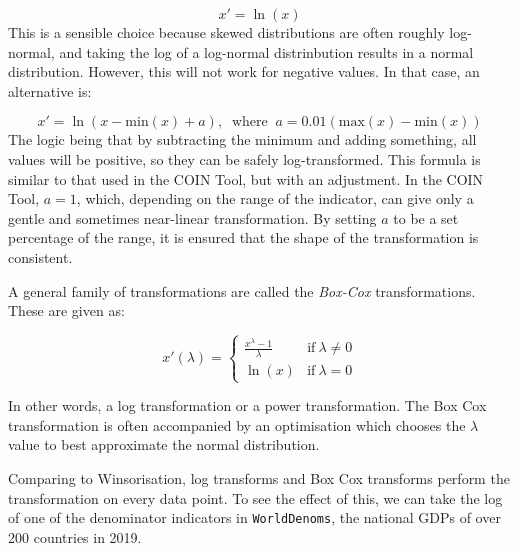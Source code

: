 \documentclass[
]{book}
\newenvironment{Shaded}{\begin{snugshade}}{\end{snugshade}}
\newcommand{\CommentTok}[1]{\textcolor[rgb]{0.56,0.35,0.01}{\textit{#1}}}
\newcommand{\DataTypeTok}[1]{\textcolor[rgb]{0.13,0.29,0.53}{#1}}
\newcommand{\KeywordTok}[1]{\textcolor[rgb]{0.13,0.29,0.53}{\textbf{#1}}}
\newcommand{\NormalTok}[1]{#1}
\newcommand{\OperatorTok}[1]{\textcolor[rgb]{0.81,0.36,0.00}{\textbf{#1}}}
\newcommand{\StringTok}[1]{\textcolor[rgb]{0.31,0.60,0.02}{#1}}
\begin{document}
\[ x' = \ln(x) \]
This is a sensible choice because skewed distributions are often roughly log-normal, and taking the log of a log-normal distrinbution results in a normal distribution. However, this will not work for negative values. In that case, an alternative is:

\[ x' = \ln(x- \text{min}(x)+a), \; \; \text{where}\; \; a = 0.01(\text{max}(x)-\text{min}(x)) \]
The logic being that by subtracting the minimum and adding something, all values will be positive, so they can be safely log-transformed. This formula is similar to that used in the COIN Tool, but with an adjustment. In the COIN Tool, \(a=1\), which, depending on the range of the indicator, can give only a gentle and sometimes near-linear transformation. By setting \(a\) to be a set percentage of the range, it is ensured that the shape of the transformation is consistent.

A general family of transformations are called the \emph{Box-Cox} transformations. These are given as:

\[ x'(\lambda) =
    \begin{cases}
      \frac{x^\lambda-1}{\lambda} & \text{if}\ \lambda  \neq 0 \\
      \ln(x) & \text{if}\ \lambda = 0
    \end{cases} \]

In other words, a log transformation or a power transformation. The Box Cox transformation is often accompanied by an optimisation which chooses the \(\lambda\) value to best approximate the normal distribution.

Comparing to Winsorisation, log transforms and Box Cox transforms perform the transformation on every data point. To see the effect of this, we can take the log of one of the denominator indicators in \texttt{WorldDenoms}, the national GDPs of over 200 countries in 2019.

\begin{Shaded}
\end{Shaded}
\end{document}
